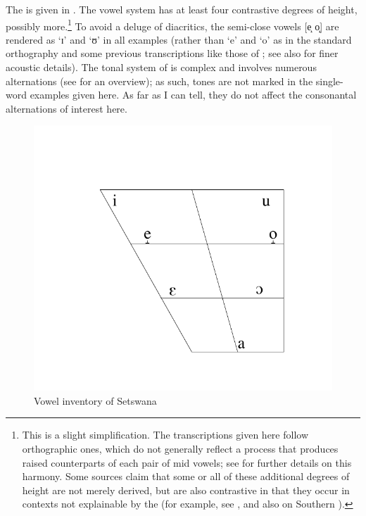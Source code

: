 \documentclass[output=paper,newtxmath,modfonts,nonflat,hidelinks]{langsci/langscibook}
\begin{document}
The  is given in  \citep{Bennett2016}. The vowel system has at least four contrastive degrees of height, possibly more.\footnote{This is a slight simplification. The transcriptions given here follow  orthographic ones, which do not generally reflect a  process that produces raised counterparts of each pair of mid vowels; see \citet{Dichabe1997} for further details on this harmony. Some sources claim that some or all of these additional degrees of height are not merely derived, but are also contrastive in that they occur in contexts not explainable by the  (for example, see \citealt{chebanneetal1997,Creissels2005emergence}, and also \citealt{Khabanyane1991} on Southern ).} To avoid a deluge of diacritics, the semi-close vowels [e̝ o̝] are rendered as ‘ɪ’ and ‘ʊ’ in all examples (rather than ‘e’ and ‘o’ as in the standard orthography and some previous transcriptions like those of \citealt{Cole1955}; see also \citealt{Roux2008} for finer acoustic details). The tonal system of  is complex and involves numerous alternations (see \citealt{chebanneetal1997} for an overview); as such, tones are not marked in the single-word examples given here. As far as I can tell, they do not affect the consonantal alternations of interest here.

   
\begin{figure}
\includegraphics[width=.5\linewidth]{figures/bennet_vowels.pdf}
\caption{Vowel inventory of Setswana \citep{Bennett2016}}
\label{fig:bennett:1}
\end{figure} 
\end{document}
